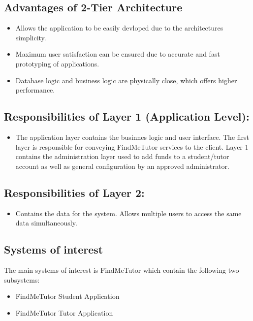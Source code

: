 \documentclass[12pt]{article}
\begin{document}
\subsection{Advantages of 2-Tier Architecture}
\begin{itemize}
\item Allows the application to be easily devloped due to the architectures simplicity.
\item Maximum user satisfaction can be ensured due to accurate and fast prototyping of applications.
\item Database logic and business logic are physically close, which offers higher performance.\\
\end{itemize}

\subsection{Responsibilities of Layer 1 (Application Level):}
\begin{itemize}
\item The application layer contains the businnes logic and user interface. The first layer is responsible for conveying FindMeTutor services to the client. Layer 1 contains the administration layer used to add funds to a student/tutor account as well as general configuration by an approved administrator.
\end{itemize}

\subsection{Responsibilities of Layer 2:}
\begin{itemize}
\item Contains the data for the system. Allows multiple users to access the same data simultaneously.
\end{itemize}

\subsection{Systems of interest}
The main systems of interest is FindMeTutor which contain the following two subsystems:
\begin{itemize}
\item FindMeTutor Student Application
\item FindMeTutor Tutor Application
\end{itemize}
\end{document}
